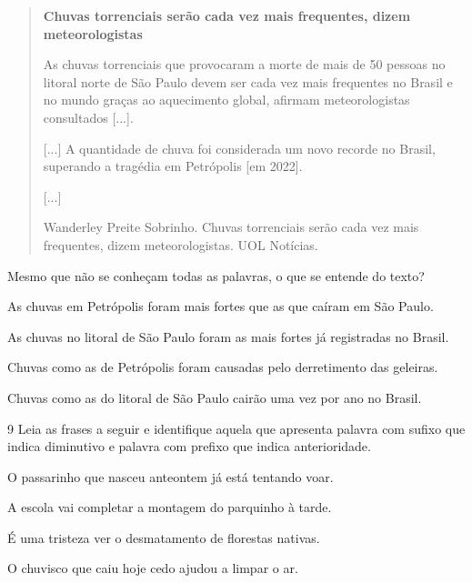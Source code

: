 \begin{quote}
\textbf{Chuvas torrenciais serão cada vez mais frequentes, dizem
meteorologistas}

As chuvas torrenciais que provocaram a morte de mais de 50 pessoas no
litoral norte de São Paulo devem ser cada vez mais frequentes no Brasil
e no mundo graças ao aquecimento global, afirmam meteorologistas
consultados {[}...{]}.

{[}...{]} A quantidade de chuva foi considerada um novo recorde no
Brasil, superando a tragédia em Petrópolis {[}em 2022{]}.

{[}...{]}

Wanderley Preite Sobrinho. Chuvas torrenciais serão cada vez mais
frequentes, dizem meteorologistas. UOL Notícias. 
\end{quote}

Mesmo que não se conheçam todas as palavras, o que se entende do texto?

\begin{escolha}
\item As chuvas em Petrópolis foram mais fortes que as que caíram em São Paulo.

\item As chuvas no litoral de São Paulo foram as mais fortes já registradas no Brasil.

\item Chuvas como as de Petrópolis foram causadas pelo derretimento das geleiras.

\item Chuvas como as do litoral de São Paulo cairão uma vez por ano no Brasil.
\end{escolha}



\pagebreak
\num{9} Leia as frases a seguir e identifique aquela que apresenta palavra
com sufixo que indica diminutivo e palavra com prefixo que indica
anterioridade.

\begin{escolha}
\item O passarinho que nasceu anteontem já está tentando voar.

\item A escola vai completar a montagem do parquinho à tarde.

\item É uma tristeza ver o desmatamento de florestas nativas.

\item O chuvisco que caiu hoje cedo ajudou a limpar o ar.
\end{escolha}


